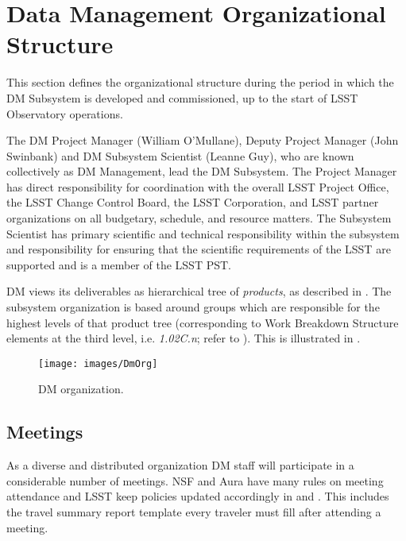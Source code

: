 \section{Data Management Organizational Structure}

This section defines the organizational structure during the period in which the \gls{DM} \gls{Subsystem} is developed and commissioned, up to the start of \gls{LSST} Observatory operations.

The \gls{DM} \gls{Project Manager} (William O'Mullane), Deputy \gls{Project Manager} (John Swinbank) and \gls{DM} \gls{Subsystem Scientist} (Leanne Guy), who are known collectively as \gls{DM} Management, lead the \gls{DM} Subsystem.
The \gls{Project Manager} has direct responsibility for coordination with the overall \gls{LSST} Project Office, the \gls{LSST} \gls{Change Control Board}, the \gls{LSST} Corporation, and \gls{LSST} partner organizations on all budgetary, schedule, and resource matters.
The \gls{Subsystem Scientist} has primary scientific and technical responsibility within the subsystem and responsibility for ensuring that the scientific requirements of the \gls{LSST} are supported and is a member of the \gls{LSST} \gls{PST}.

DM views its deliverables as hierarchical tree of \textit{products}, as described in .
The subsystem organization is based around groups which are responsible for the highest levels of that product tree (corresponding to \gls{Work Breakdown Structure} elements at the third level, i.e. \textit{1.02C.n}; refer to ).
This is illustrated in .

\begin{figure}[htbp]
\begin{center}
 \texttt{[image: images/DmOrg]}
\caption{DM organization. \label{fig:dmorg}}
\end{center}
\end{figure}

\subsection {Meetings} \label{sect:meetings}

As a diverse and distributed organization \gls{DM} staff will participate in a considerable number of meetings.
NSF and Aura have many rules on meeting attendance and \gls{LSST} keep policies updated accordingly in  and . This includes the travel summary report template  every traveler must fill after attending a meeting.

